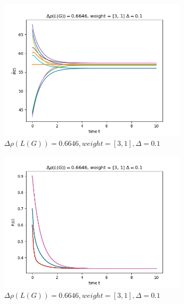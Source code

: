 \documentclass{article}
\begin{document}
\begin{problem}
    \newpage
    \begin{figure}[!h]
        \centering
        \begin{subfigure}{0.4\textwidth}
            \includegraphics[width=\textwidth]{./img/Figure_4.png}
            \caption{$\Delta \rho (L(G)) = 0.6646, weight = [3,1], \Delta = 0.1$ }
        \end{subfigure}
        \begin{subfigure}{0.4\textwidth}
            \includegraphics[width=\textwidth]{./img/Figure_5.png}
            \caption{$\Delta \rho (L(G)) = 0.6646, weight = [3,1], \Delta = 0.1$ }
        \end{subfigure}
        \begin{subfigure}{0.4\textwidth}

\end{subfigure}
\end{figure}
\end{problem}
\end{document}
